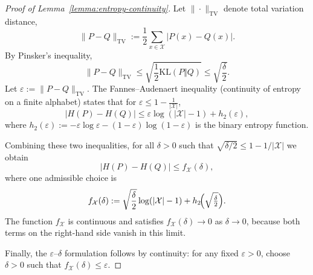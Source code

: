 \documentclass{article}
\begin{document}
\begin{proof}[Proof of Lemma~\ref{lemma:entropy-continuity}]
Let $\|\cdot\|_{\mathrm{TV}}$ denote total variation distance,
\[
\|P - Q\|_{\mathrm{TV}} := \frac12 \sum_{x \in \mathcal{X}} |P(x) - Q(x)|.
\]
By Pinsker's inequality,
\[
\|P - Q\|_{\mathrm{TV}} \le \sqrt{\frac12 \mathrm{KL}(P \Vert Q)}
\le \sqrt{\frac{\delta}{2}}.
\]
Let $\varepsilon := \|P-Q\|_{\mathrm{TV}}$. The Fannes--Audenaert inequality \cite{Audenaert_2007} (continuity of entropy on a finite alphabet) states that
for $\varepsilon \le 1 - \tfrac{1}{|\mathcal{X}|}$,
\[
\bigl|H(P) - H(Q)\bigr|
\le \varepsilon \log(|\mathcal{X}| - 1) + h_2(\varepsilon),
\]
where $h_2(\varepsilon) := -\varepsilon \log \varepsilon
- (1-\varepsilon)\log(1-\varepsilon)$ is the binary entropy function.

Combining these two inequalities, for all $\delta > 0$ such that
$\sqrt{\delta/2} \le 1 - 1/|\mathcal{X}|$ we obtain
\[
\bigl|H(P) - H(Q)\bigr|
\le f_\mathcal{X}(\delta),
\]
where one admissible choice is
\[
f_\mathcal{X}(\delta)
:= \sqrt{\frac{\delta}{2}} \log(|\mathcal{X}| - 1)
+ h_2\!\Bigl(\sqrt{\tfrac{\delta}{2}}\Bigr).
\]
The function $f_\mathcal{X}$ is continuous and satisfies
$f_\mathcal{X}(\delta) \to 0$ as $\delta \to 0$, because both
terms on the right-hand side vanish in this limit.

Finally, the $\varepsilon$--$\delta$ formulation follows by continuity:
for any fixed $\varepsilon > 0$, choose $\delta > 0$ such that
$f_\mathcal{X}(\delta) \le \varepsilon$.
\end{proof}
\end{document}
